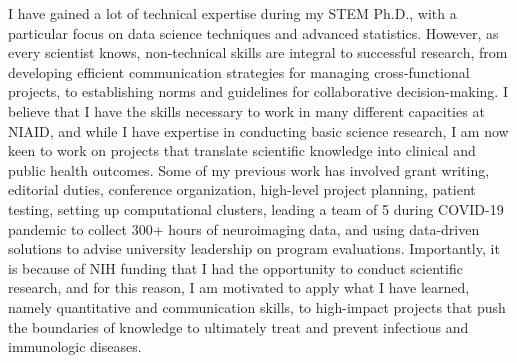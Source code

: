 \documentclass[9pt, a4paper]{maedbh-cv}
\begin{document}
\begin{cvletter}
I have gained a lot of technical expertise during my STEM Ph.D., with a particular focus on data science techniques and advanced statistics. However, as every scientist knows, non-technical skills are integral to successful research, from developing efficient communication strategies for managing cross-functional projects, to establishing norms and guidelines for collaborative decision-making. I believe that I have the skills necessary to work in many different capacities at NIAID, and while I have expertise in conducting basic science research, I am now keen to work on projects that translate scientific knowledge into clinical and public health outcomes. Some of my previous work has involved grant writing, editorial duties, conference organization, high-level project planning, patient testing, setting up computational clusters, leading a team of 5 during COVID-19 pandemic to collect 300+ hours of neuroimaging data, and using data-driven solutions to advise university leadership on program evaluations. Importantly, it is because of NIH funding that I had the opportunity to conduct scientific research, and for this reason, I am motivated to apply what I have learned, namely quantitative and communication skills, to high-impact projects that push the boundaries of knowledge to ultimately treat and prevent infectious and immunologic diseases.

\end{cvletter}

\makeletterclosing
\end{document}
